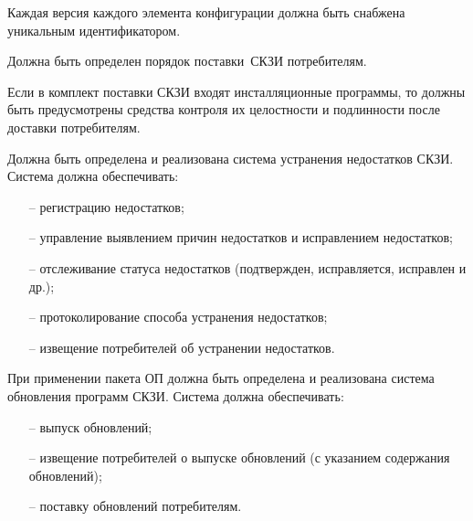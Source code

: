 \label{R.LC.CMVersion} %
Каждая версия каждого элемента конфигурации 
должна быть снабжена уникальным идентификатором. 

\label{R.LC.Delivery} %
Должна быть определен порядок поставки~СКЗИ потребителям.  

\label{R.LC.Authenticode} %
Если в комплект поставки СКЗИ входят инсталляционные программы, то должны быть
предусмотрены средства контроля их целостности и подлинности после доставки
потребителям.

\label{R.LC.FlawRemediation} %
Должна быть определена и реализована система устранения недостатков СКЗИ.
%
Система должна обеспечивать:
\begin{itemize}
\item[--]
регистрацию недостатков;
\item[--]
управление выявлением причин недостатков и исправлением недостатков;
\item[--]
отслеживание статуса недостатков 
(подтвержден, исправляется, исправлен и др.);
\item[--]
протоколирование способа устранения недостатков;
\item[--]
извещение потребителей об устранении недостатков.
\end{itemize}

\label{R.LC.SU} %
При применении пакета ОП должна быть определена и реализована система 
обновления программ СКЗИ. 
%
Система должна обеспечивать:
\begin{itemize}
\item[--]
выпуск обновлений;
\item[--]
извещение потребителей о выпуске обновлений (с указанием содержания 
обновлений);  
\item[--]
поставку обновлений потребителям.
\end{itemize}

